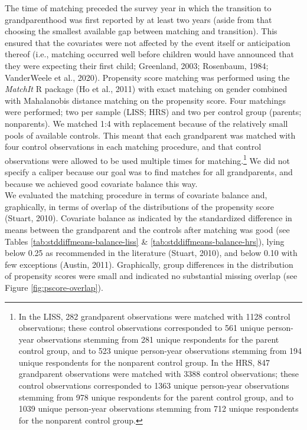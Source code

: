 \documentclass[
  english,
  man, noextraspace,floatsintext]{apa7}
\begin{document}
The time of matching preceded the survey year in which the transition to grandparenthood was first reported by at least two years (aside from that choosing the smallest available gap between matching and transition). This ensured that the covariates were not affected by the event itself or anticipation thereof (i.e., matching occurred well before children would have announced that they were expecting their first child; Greenland, 2003; Rosenbaum, 1984; VanderWeele et al., 2020). Propensity score matching was performed using the \emph{MatchIt} R package (Ho et al., 2011) with exact matching on gender combined with Mahalanobis distance matching on the propensity score. Four matchings were performed; two per sample (LISS; HRS) and two per control group (parents; nonparents). We matched 1:4 with replacement because of the relatively small pools of available controls. This meant that each grandparent was matched with four control observations in each matching procedure, and that control observations were allowed to be used multiple times for matching.\footnote{In the LISS, 282 grandparent observations were matched with 1128 control observations; these control observations corresponded to 561 unique person-year observations stemming from 281 unique respondents for the parent control group, and to 523 unique person-year observations stemming from 194 unique respondents for the nonparent control group. In the HRS, 847 grandparent observations were matched with 3388 control observations; these control observations corresponded to 1363 unique person-year observations stemming from 978 unique respondents for the parent control group, and to 1039 unique person-year observations stemming from 712 unique respondents for the nonparent control group.} We did not specify a caliper because our goal was to find matches for all grandparents, and because we achieved good covariate balance this way.\\
We evaluated the matching procedure in terms of covariate balance and, graphically, in terms of overlap of the distributions of the propensity score (Stuart, 2010). Covariate balance as indicated by the standardized difference in means between the grandparent and the controls after matching was good (see Tables \ref{tab:stddiffmeans-balance-liss} \& \ref{tab:stddiffmeans-balance-hrs}), lying below 0.25 as recommended in the literature (Stuart, 2010), and below 0.10 with few exceptions (Austin, 2011). Graphically, group differences in the distribution of propensity scores were small and indicated no substantial missing overlap (see Figure \ref{fig:pscore-overlap}).\\
\end{document}
